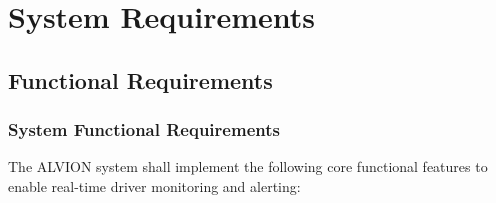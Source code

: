 \documentclass[11pt]{report}
\begin{document}
\section{\textcolor{qcRed}{System Requirements}}

\subsection{Functional Requirements}

\subsubsection{System Functional Requirements}
The ALVION system shall implement the following core functional features to enable real-time driver monitoring and alerting:
\end{document}
